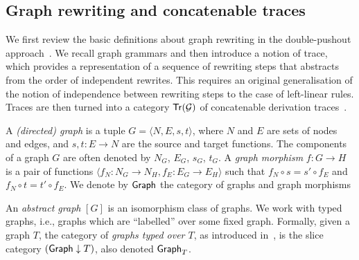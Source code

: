 \subsection{Graph rewriting and concatenable traces}
\label{ss:back-graph}

We first review the basic definitions about graph rewriting in the double-pushout approach~\cite{Ehr:TIAA}.
%
We recall graph grammars and then introduce a notion of trace, which provides a representation of a sequence of 
rewriting steps that abstracts from the order of independent rewrites. This requires an original generalisation of the notion of independence between rewriting steps to the case of left-linear rules.
%
Traces are then turned into a category 
$\mathsf{Tr}({\mathcal{G}})$ of concatenable derivation traces~\cite{CELMR:ESSG}.


\begin{definition}
A \emph{(directed) graph} is a tuple
$G = \langle N, E, s, t \rangle$, where $N$ and $E$ are 
sets of
nodes and edges, and $s, t: E \rightarrow N$ are the source and target
functions.  The components of a graph $G$ are often denoted by
$N_G$, $E_G$, $s_G$, $t_G$.  A \emph{graph morphism}
$f: G \rightarrow H$ is a pair of functions
$\langle f_N: N_G \rightarrow N_H, f_E: E_G \rightarrow E_H\rangle$ such
that $f_N \circ s = s' \circ f_E$ and $f_N \circ t = t' \circ f_E$.
We denote by $\mathsf{Graph}$ the category of graphs and graph morphisms
%

\end{definition}

An \emph{abstract graph} $[G]$ is an isomorphism class of
graphs.
We work with typed graphs, i.e., graphs which are
``labelled'' over some fixed graph. Formally, given a graph $T$, the category of
\emph{graphs typed over $T$}, as introduced in~\cite{CMR:GP}, is the
slice category $({\mathsf{Graph}} \downarrow {T})$, also denoted $\mathsf{Graph}_{T}$.

